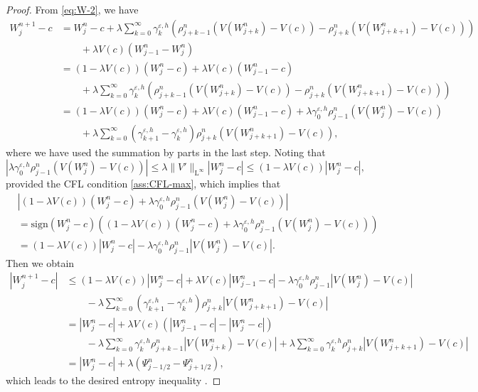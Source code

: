 \documentclass[10pt]{amsart}
\theoremstyle{plain}
\theoremstyle{definition}
\numberwithin{equation}{section}
\newcommand{\eps}{{\varepsilon}}
\newcommand{\sgn}[1]{\mathrm{sign}\left(#1\right)}
\begin{document}
\begin{proof}
From \cref{eq:W-2}, we have 
\begin{align*}
    W_j^{n+1}-c 
    &= W_j^n-c + \lambda \sum_{k=0}^\infty \gamma_k^{\eps,h} \left( \rho_{j+k-1}^n \left(V(W_{j+k}^n)-V(c)\right) - \rho_{j+k}^n \left(V(W_{j+k+1}^n)-V(c)\right) \right) \\ &\qquad + \lambda V(c) (W_{j-1}^n-W_j^n) \\
    &= \left(1-\lambda V(c)\right) (W_j^n-c) + \lambda V(c) (W_{j-1}^n-c) \\
    &\qquad + \lambda \sum_{k=0}^\infty \gamma_k^{\eps,h} \left( \rho_{j+k-1}^n \left(V(W_{j+k}^n)-V(c)\right) - \rho_{j+k}^n \left(V(W_{j+k+1}^n)-V(c)\right) \right) \\
    &= \left(1-\lambda V(c)\right) (W_j^n-c) + \lambda V(c) (W_{j-1}^n-c) + \lambda \gamma_0^{\eps,h}\rho_{j-1}^n \left(V(W_j^n)-V(c)\right) \\
    &\qquad +\lambda \sum_{k=0}^\infty \left(\gamma_{k+1}^{\eps,h}-\gamma_k^{\eps,h}\right) \rho_{j+k}^n \left(V(W_{j+k+1}^n)-V(c)\right),
\end{align*}
where we have used the summation by parts in the last step. Noting that 
\[ \left|\lambda \gamma_0^{\eps,h}\rho_{j-1}^n \left(V(W_j^n)-V(c)\right)\right| \leq \lambda \|V'\|_{\mathrm{L}^\infty} |W_j^n-c| \leq \left(1-\lambda V(c)\right) |W_j^n-c|, \]
provided the CFL condition \cref{ass:CFL-max}, which implies that
\begin{align*}
    &\left|\left(1-\lambda V(c)\right) (W_j^n-c) + \lambda \gamma_0^{\eps,h}\rho_{j-1}^n \left(V(W_j^n)-V(c)\right)\right| \\
    &= \sgn{W_j^n-c} \left( \left(1-\lambda V(c)\right) (W_j^n-c) + \lambda \gamma_0^{\eps,h}\rho_{j-1}^n \left(V(W_j^n)-V(c)\right) \right) \\
    &= \left(1-\lambda V(c)\right) |W_j^n-c| - \lambda \gamma_0^{\eps,h}\rho_{j-1}^n \left|V(W_j^n)-V(c)\right|.
\end{align*}
Then we obtain
\begin{align*}
    |W_j^{n+1}-c| 
    &\leq (1-\lambda V(c)) |W_j^n-c| + \lambda V(c) |W_{j-1}^n-c| - \lambda \gamma_0^{\eps,h}\rho_{j-1}^n \left|V(W_j^n)-V(c)\right| \\
    &\qquad -\lambda \sum_{k=0}^\infty \left(\gamma_{k+1}^{\eps,h}-\gamma_k^{\eps,h}\right) \rho_{j+k}^n \left|V(W_{j+k+1}^n)-V(c)\right| \\
    &= |W_j^n-c| + \lambda V(c) \left(|W_{j-1}^n-c|-|W_j^n-c|\right) \\
    &\qquad -\lambda \sum_{k=0}^\infty \gamma_k^{\eps,h} \rho_{j+k-1}^n \left|V(W_{j+k}^n)-V(c)\right| +\lambda \sum_{k=0}^\infty \gamma_k^{\eps,h} \rho_{j+k}^n \left|V(W_{j+k+1}^n)-V(c)\right| \\
    &= |W_j^n-c| + \lambda (\Psi_{j-1/2}^n - \Psi_{j+1/2}^n),
\end{align*}
which leads to the desired entropy inequality .
\end{proof}
\end{document}

